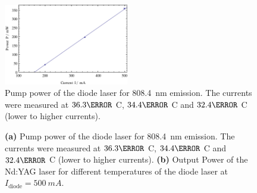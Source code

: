 \documentclass[a4paper]{scrartcl}
\numberwithin{equation}{section}
\numberwithin{figure}{section}
\numberwithin{table}{section}
\begin{document}
\begin{figure}
\centering
\includegraphics[width=0.485\textwidth]{img/PvsI808.pdf}
\caption{ \small  Pump power of the diode laser for \SI{808.4}{nm} emission. The currents were measured at $36.3 \degree$ C, $34.4 \degree$ C and $32.4 \degree$ C (lower to higher currents). }
\label{fig:cal}
\end{figure}

\begin{figure}
\centering
{}
\hfill
{}
\caption{\small \textbf{(a)} Pump power of the diode laser for \SI{808.4}{nm} emission. The currents were measured at $36.3 \degree$ C, $34.4 \degree$ C and $32.4 \degree$ C (lower to higher currents). \textbf{(b)} Output Power of the Nd:YAG laser for different temperatures of the diode laser at $I_\text{diode}=\SI{500}{mA}$.}
\label{fig:power}
\end{figure}
\end{document}
